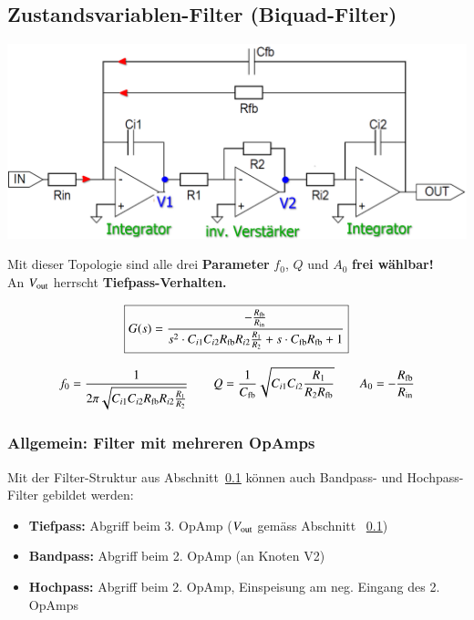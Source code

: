\subsection{Zustandsvariablen-Filter (Biquad-Filter)}
\label{zustandsvariablenfilter}

\begin{minipage}[c]{0.6\columnwidth}
    \includegraphics[width=\columnwidth]{images/zustandsvariablenfilter.png}
\end{minipage}
\hfill
\begin{minipage}[c]{0.38\columnwidth}
    \raggedright%
    Mit dieser Topologie sind alle drei \textbf{Parameter} $f_0$, $Q$ und $A_0$ \textbf{frei wählbar!} \\
    An $V_{\rm out}$ herrscht \textbf{Tiefpass-Verhalten.}
\end{minipage}

$$ \boxed{ G(s) = \frac{- \frac{R_{\rm fb}}{R_{\rm in}}}{s^2 \cdot C_{i1} C_{i2} R_{\rm fb} R_{i2} \frac{R_1}{R_2} + s \cdot C_{\rm fb} R_{\rm fb} + 1} } $$

$$ f_0 = \frac{1}{2 \pi \sqrt{C_{i1} C_{i2} R_{\rm fb} R_{i2} \frac{R_1}{R_2}}} \qquad Q = \frac{1}{C_{\rm fb}} \sqrt{C_{i1} C_{i2} \frac{R_1}{R_2 R_{\rm fb}} } 
\qquad A_0 = - \frac{R_{\rm fb}}{R_{\rm in}} $$


\subsubsection{Allgemein: Filter mit mehreren OpAmps}

Mit der Filter-Struktur aus Abschnitt~\ref{zustandsvariablenfilter} können auch Bandpass- und Hochpass-Filter gebildet werden:
\begin{itemize}
    \item \textbf{Tiefpass:} Abgriff beim 3. OpAmp ($V_{\rm out}$ gemäss Abschnitt ~\ref{zustandsvariablenfilter})
    \item \textbf{Bandpass:} Abgriff beim 2. OpAmp (an Knoten V2)
    \item \textbf{Hochpass:} Abgriff beim 2. OpAmp, Einspeisung am neg. Eingang des 2. OpAmps 
\end{itemize}